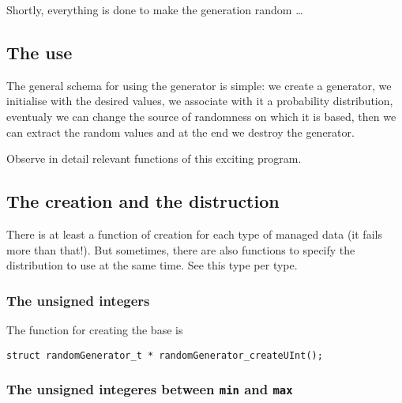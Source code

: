    Shortly, everything is done to make the generation random \ldots


%
\subsection{The use}

  The general schema for using the generator is simple: we create a generator,
we initialise with the desired values, we associate with it a probability 
distribution, eventualy we can change the source of randomness on which it is based,
then we can extract the random values and at the end we destroy the generator.

   Observe in detail relevant functions of this exciting program.

%
\subsection{The creation and the distruction}
   
   There is at least a function of creation for each type of
managed data (it fails more than that!). But sometimes, there are also
functions to specify the distribution to use at the same time. 
See this type per type.

%
\subsubsection{The unsigned integers}

   The function for creating the base is 

\begin{verbatim}
struct randomGenerator_t * randomGenerator_createUInt();
\end{verbatim}

%
\subsubsection{The unsigned integeres between {\tt min} and {\tt max}}

